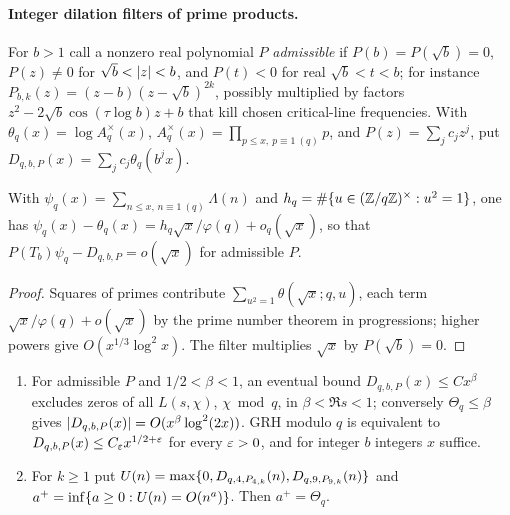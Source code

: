 \paragraph{Integer dilation filters of prime products.}
For $b>1$ call a nonzero real polynomial $P$ \emph{admissible} if $P(b)=P(\sqrt b)=0$,
$P(z)\ne0$ for $\sqrt b<\lvert z\rvert<b$, and $P(t)<0$ for real $\sqrt b<t<b$; for instance
$P_{b,k}(z)=(z-b)(z-\sqrt b)^{2k}$, possibly multiplied by factors
$z^2-2\sqrt b\cos(\tau\log b)z+b$ that kill chosen critical-line frequencies. With
$\theta_q(x)=\log A_q^\times(x)$, $A_q^\times(x)=\prod_{p\le x,\ p\equiv1\ (q)}p$, and
$P(z)=\sum_jc_jz^j$, put $D_{q,b,P}(x)=\sum_jc_j\theta_q(b^jx)$.

\begin{lemma}\label{ana:lem:squares}
With $\psi_q(x)=\sum_{n\le x,\,n\equiv1\ (q)}\Lambda(n)$ and
$h_q=\#\{u\in(\mathbb{Z}/q\mathbb{Z})^\times:u^2=1\}$, one has
$\psi_q(x)-\theta_q(x)=h_q\sqrt x/\varphi(q)+o_q(\sqrt x)$, so that
$P(T_b)\psi_q-D_{q,b,P}=o(\sqrt x)$ for admissible $P$.
\end{lemma}

\begin{proof}
Squares of primes contribute $\sum_{u^2=1}\theta(\sqrt x;q,u)$, each term
$\sqrt x/\varphi(q)+o(\sqrt x)$ by the prime number theorem in progressions; higher powers
give $O(x^{1/3}\log^2x)$. The filter multiplies $\sqrt x$ by $P(\sqrt b)=0$.
\end{proof}

\begin{theorem}\label{ana:thm:dilation}
\begin{enumerate}[label=\textup{(\roman*)}]
\item For admissible $P$ and $1/2<\beta<1$, an eventual bound $D_{q,b,P}(x)\le Cx^\beta$
 excludes zeros of all $L(s,\chi)$, $\chi\bmod q$, in $\beta<\Re s<1$; conversely
 $\Theta_q\le\beta$ gives $\lvert D_{q,b,P}(x)\rvert=O(x^\beta\log^2(2x))$. GRH modulo $q$ is
 equivalent to $D_{q,b,P}(x)\le C_\varepsilon x^{1/2+\varepsilon}$ for every $\varepsilon>0$, and for integer $b$
 integers $x$ suffice.
\item For $k\ge1$ put $U(n)=\max\{0,D_{q,4,P_{4,k}}(n),D_{q,9,P_{9,k}}(n)\}$ and
 $a^+=\inf\{a\ge0:U(n)=O(n^a)\}$. Then $a^+=\Theta_q$.
\end{enumerate}
\end{theorem}

